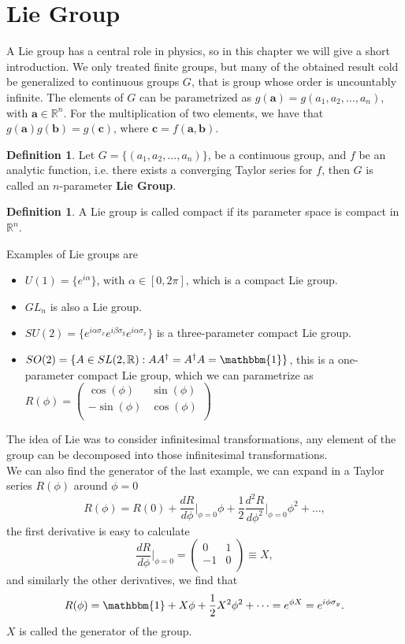 \documentclass[12pt]{book}
\theoremstyle{plain}
\newcommand{\R}{\mathbb{R}}
\newcommand{\I}{\mathbbm{1}}
\theoremstyle{definition}
\newtheorem{dfn}[thm]{Definition}
\theoremstyle{remark}
\begin{document}
\section{Lie Group}
A Lie group has a central role in physics, so in this chapter we will give a short introduction. We only treated finite groups, but many of the obtained result cold be generalized to continuous groups $G$, that is group whose order is uncountably infinite. The elements of $G$ can be parametrized as $g(\mathbf{a}) = g(a_1,a_2,\dots,a_n)$, with $\mathbf{a}\in\R^n$. For the multiplication of two elements, we have that $g(\mathbf{a})g(\mathbf{b})=g(\mathbf{c})$, where $\mathbf{c} = f(\mathbf{a},\mathbf{b})$.
\begin{dfn}
Let $G = \{(a_1,a_2,\dots,a_n)\}$, be a continuous group, and $f$ be an analytic function, i.e. there exists a converging Taylor series for $f$, then $G$ is called an $n$-parameter \textbf{Lie Group}.
\end{dfn}
\begin{dfn}
A Lie group is called compact if its parameter space is compact in $\R^n$.
\end{dfn}
Examples of Lie groups are
\begin{itemize}
	\item $U(1) = \{e^{i\alpha}\}$, with $\alpha\in[0,2\pi]$, which is a compact Lie group.
	\item $GL_n$ is also a Lie group.
	\item $SU(2) = \{e^{i\alpha\sigma_x}e^{i\beta\sigma_y}e^{i\alpha\sigma_x}\}$ is a three-parameter compact Lie group.
	\item $SO(2) =\{A\in SL(2,\R): AA^\dagger = A^\dagger A = \I\}$, this is a one-parameter compact Lie group, which we can parametrize as $R(\phi) = \begin{pmatrix}
	\cos(\phi) & \sin(\phi)\\
	-\sin(\phi) & \cos(\phi)\\
	\end{pmatrix}$
\end{itemize}
The idea of Lie was to consider infinitesimal transformations, any element of the group can be decomposed into those infinitesimal transformations.\\
We can also find the generator of the last example, we can expand in a Taylor series $R(\phi)$ around $\phi=0$
\[R(\phi) = R(0) + \frac{dR}{d\phi}\Bigg|_{\phi=0} \phi + \frac{1}{2}\frac{d^2R}{d\phi^2}\Bigg|_{\phi=0} \phi^2 +\dots,\]
the first derivative is easy to calculate 
\[\frac{dR}{d\phi}\Bigg|_{\phi=0} = \begin{pmatrix}
	0 & 1\\
	-1 & 0\\
	\end{pmatrix}  \equiv X ,\]
and similarly the other derivatives, we find that
\[R(\phi) = \I + X\phi + \frac{1}{2}X^2\phi^2+\dots = e^{\phi X} = e^{i\phi \sigma_y}.\]
$X$ is called the generator of the group.

%
\end{document}
